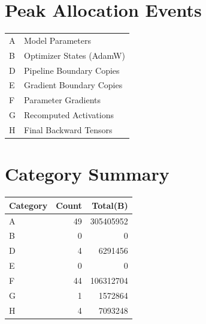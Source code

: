 \documentclass{article}
\begin{document}
\section*{Peak Allocation Events}
\small
\begin{tabular}{ll}
A & Model Parameters \\
B & Optimizer States (AdamW) \\
D & Pipeline Boundary Copies \\
E & Gradient Boundary Copies \\
F & Parameter Gradients \\
G & Recomputed Activations \\
H & Final Backward Tensors \\
\end{tabular}
\vspace{0.5em}
\section*{Category Summary}
\begin{tabular}{l r r}
Category & Count & Total(B) \\
\hline
A & 49 & 305405952 \\
B & 0 & 0 \\
D & 4 & 6291456 \\
E & 0 & 0 \\
F & 44 & 106312704 \\
G & 1 & 1572864 \\
H & 4 & 7093248 \\
\end{tabular}
\vspace{0.5em}
\end{document}
